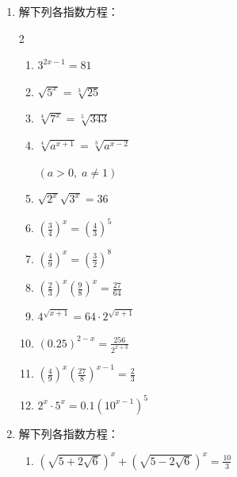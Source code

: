\begin{enumerate}
  \item 解下列各指数方程：
\begin{multicols}{2}
\begin{enumerate}
\item $3^{2 x-1}=81$
\item $\sqrt{5^{x}}=\sqrt[3]{25}$
\item  $\sqrt[4]{7^{x}}=\sqrt[5]{343}$
\item $\sqrt[4]{a^{x+1}}=\sqrt[3]{a^{x-2}}$

$(a>0,\;  a \neq 1)$
\item  $\sqrt{2^{x}} \sqrt{3^{x}}=36$
\item $\left(\frac{3}{4}\right)^x=\left(\frac{4}{3}\right)^5$
  \item $\left(\frac{4}{9}\right)^{x}=\left(\frac{3}{2}\right)^{8}$
  \item $\left(\frac{2}{3}\right)^{x}\left(\frac{9}{8}\right)^{x}=\frac{27}{64}$
  \item $ 4^{\sqrt{x+1}}=64 \cdot 2^{\sqrt{x+1}} $
  \item $(0.25)^{2-x}=\frac{256}{2^{x+3}}$
  \item  $\left(\frac{4}{9}\right)^{x}\left(\frac{27}{8}\right)^{x-1}=\frac{2}{3}$
  \item  $2^{x} \cdot 5^{x}=0.1\left(10^{x-1}\right)^{5}$
\end{enumerate}
\end{multicols}


\item  解下列各指数方程：
\begin{enumerate}
\item   $\left(\sqrt{5+2 \sqrt{6}}\right)^{x}+\left(\sqrt{5-2 \sqrt{6}}\right)^{x}=\frac{10}{3}$
\end{enumerate}



\end{enumerate}
